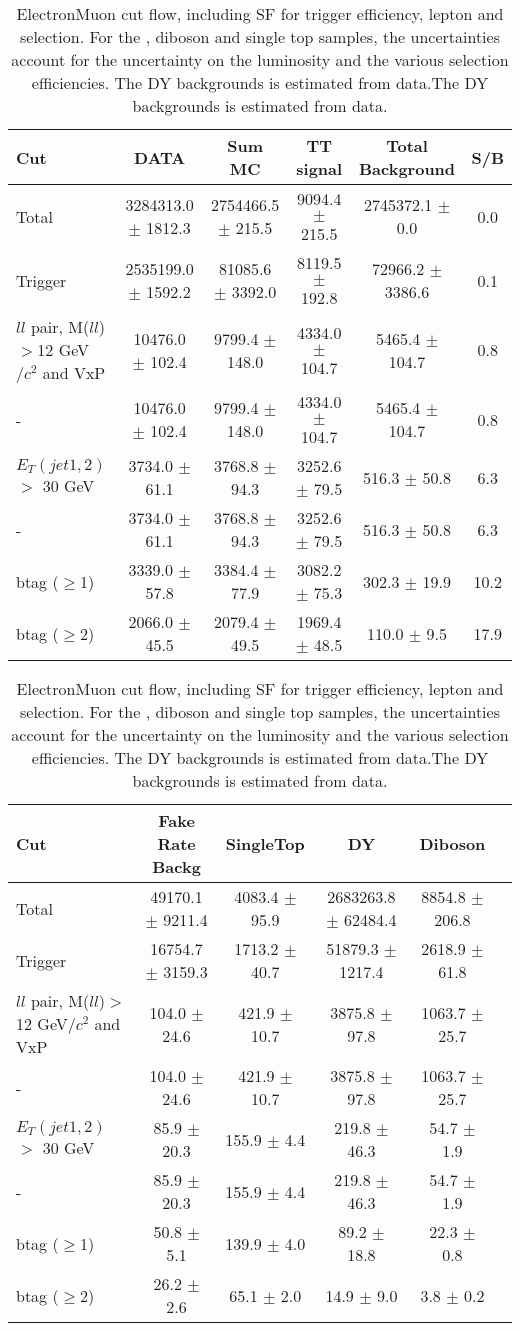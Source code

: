 \documentclass[amsmath,amssymb]{revtex4}
\begin{document}
\begin{landscape}
\begin{table}[p]
\begin{tabular}{|l|c|c|c|c|c|}
\hline
\hline
Cut & DATA & Sum MC & TT signal  & Total Background & S/B \\
\hline
Total & 3284313.0 $\pm$ 1812.3 & 2754466.5 $\pm$ 215.5 & 9094.4 $\pm$ 215.5 & 2745372.1 $\pm$ 0.0 & 0.0 \\
Trigger & 2535199.0 $\pm$ 1592.2 & 81085.6 $\pm$ 3392.0 & 8119.5 $\pm$ 192.8 & 72966.2 $\pm$ 3386.6 & 0.1 \\
$ll$ pair, M($ll$)$>$12 GeV$/c^2$ and VxP & 10476.0 $\pm$ 102.4 & 9799.4 $\pm$ 148.0 & 4334.0 $\pm$ 104.7 & 5465.4 $\pm$ 104.7 & 0.8 \\
 -  & 10476.0 $\pm$ 102.4 & 9799.4 $\pm$ 148.0 & 4334.0 $\pm$ 104.7 & 5465.4 $\pm$ 104.7 & 0.8 \\
$E_T(jet1,2)$ $>$ 30 GeV & 3734.0 $\pm$ 61.1 & 3768.8 $\pm$ 94.3 & 3252.6 $\pm$ 79.5 & 516.3 $\pm$ 50.8 & 6.3 \\
 -  & 3734.0 $\pm$ 61.1 & 3768.8 $\pm$ 94.3 & 3252.6 $\pm$ 79.5 & 516.3 $\pm$ 50.8 & 6.3 \\
btag ($\ge$1) & 3339.0 $\pm$ 57.8 & 3384.4 $\pm$ 77.9 & 3082.2 $\pm$ 75.3 & 302.3 $\pm$ 19.9 & 10.2 \\
btag ($\ge$2) & 2066.0 $\pm$ 45.5 & 2079.4 $\pm$ 49.5 & 1969.4 $\pm$ 48.5 & 110.0 $\pm$ 9.5 & 17.9 \\
\hline
\hline
\end{tabular}
\begin{tabular}{|l|c|c|c|c|c|}
\hline
\hline
Cut & Fake Rate Backg & SingleTop & DY & Diboson  \\
\hline
Total & 49170.1 $\pm$ 9211.4 & 4083.4 $\pm$ 95.9 & 2683263.8 $\pm$ 62484.4 & 8854.8 $\pm$ 206.8 \\
Trigger & 16754.7 $\pm$ 3159.3 & 1713.2 $\pm$ 40.7 & 51879.3 $\pm$ 1217.4 & 2618.9 $\pm$ 61.8 \\
$ll$ pair, M($ll$)$>$12 GeV$/c^2$ and VxP & 104.0 $\pm$ 24.6 & 421.9 $\pm$ 10.7 & 3875.8 $\pm$ 97.8 & 1063.7 $\pm$ 25.7 \\
 -  & 104.0 $\pm$ 24.6 & 421.9 $\pm$ 10.7 & 3875.8 $\pm$ 97.8 & 1063.7 $\pm$ 25.7 \\
$E_T(jet1,2)$ $>$ 30 GeV & 85.9 $\pm$ 20.3 & 155.9 $\pm$ 4.4 & 219.8 $\pm$ 46.3 & 54.7 $\pm$ 1.9 \\
 -  & 85.9 $\pm$ 20.3 & 155.9 $\pm$ 4.4 & 219.8 $\pm$ 46.3 & 54.7 $\pm$ 1.9 \\
btag ($\ge$1) & 50.8 $\pm$ 5.1 & 139.9 $\pm$ 4.0 & 89.2 $\pm$ 18.8 & 22.3 $\pm$ 0.8 \\
btag ($\ge$2) & 26.2 $\pm$ 2.6 & 65.1 $\pm$ 2.0 & 14.9 $\pm$ 9.0 & 3.8 $\pm$ 0.2 \\
\hline 
\hline
\end{tabular}
\caption{ ElectronMuon cut flow, including SF for trigger efficiency, lepton and \met selection. For the \ttbar, diboson and single top samples, the uncertainties account for the uncertainty on the luminosity and the various selection efficiencies. The DY backgrounds is estimated from data.The DY backgrounds is estimated from data.  }
\label{Table:CutFlow_emu}
\end{table}
\end{landscape}
\end{document}
